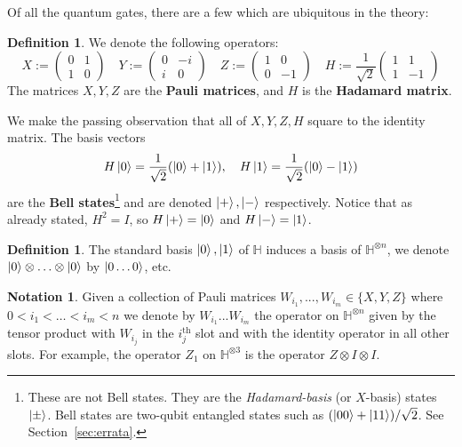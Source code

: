 \documentclass[12pt]{article}
\theoremstyle{plain}
\theoremstyle{definition}
\newtheorem{defn}[thm]{Definition} %
\newtheorem{notation}[thm]{Notation}
\newcommand{\bb}[1]{\mathbb{#1}}
\begin{document}
Of all the quantum gates, there are a few which are ubiquitous in the theory:
\begin{defn}
We denote the following operators:
\begin{equation}
X :=
\begin{pmatrix}
0 &1\\
1 &0
\end{pmatrix}
\quad
Y :=
\begin{pmatrix}
0 & -i\\
i & 0
\end{pmatrix}
\quad
Z :=
\begin{pmatrix}
1 & 0\\
0 & -1
\end{pmatrix}
\quad
H :=
\frac{1}{\sqrt{2}}
\begin{pmatrix}
1 & 1\\
1 & -1
\end{pmatrix}
\end{equation}
The matrices $X,Y,Z$ are the \textbf{Pauli matrices}, and $H$ is the \textbf{Hadamard matrix}.
\end{defn}
We make the passing observation that all of $X,Y,Z,H$ square to the identity matrix. The basis vectors
\begin{equation}
H\ket{0} = \frac{1}{\sqrt{2}}(\ket{0} + \ket{1}),\quad H\ket{1} = \frac{1}{\sqrt{2}}(\ket{0} - \ket{1})
\end{equation}
are the \textbf{Bell states}\footnote{These are not Bell states. They are the \emph{Hadamard-basis} (or $X$-basis) states $\ket{\pm}$. Bell states are two-qubit entangled states such as $(\ket{00}+\ket{11})/\sqrt{2}$. See Section~\ref{sec:errata}.} and are denoted $\ket{+},\ket{-}$ respectively. Notice that as already stated, $H^2 = I$, so $H\ket{+} = \ket{0}$ and $H\ket{-} = \ket{1}$.
\begin{defn}
The standard basis $\ket{0},\ket{1}$ of $\bb{H}$ induces a basis of $\bb{H}^{\otimes n}$, we denote $\ket{0} \otimes \hdots \otimes \ket{0}$ by $\ket{0\hdots 0}$, etc.
\end{defn}

\begin{notation}
Given a collection of Pauli matrices $W_{i_1},...,W_{i_m} \in \lbrace X,Y,Z\rbrace$ where $0 < i_1 < \hdots < i_m < n$ we denote by $W_{i_1}...W_{i_m}$ the operator on $\bb{H}^{\otimes n}$ given by the tensor product with $W_{i_j}$ in the $i_j^{\text{th}}$ slot and with the identity operator in all other slots. For example, the operator $Z_1$ on $\bb{H}^{\otimes 3}$ is the operator $Z \otimes I \otimes I$.
\end{notation}
\end{document}
